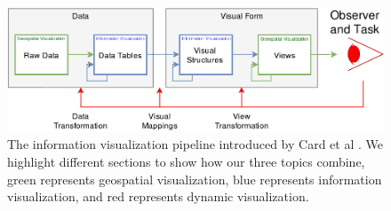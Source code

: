\begin{figure}[hb]
\centering
\includegraphics[width=1\textwidth]{images/ch1/TopicBreakdown2}
\caption{The information visualization pipeline introduced by Card et al \cite{card1999readings}. We highlight different sections to show how our three topics combine, green represents geospatial visualization, blue represents information visualization, and red represents dynamic visualization.                                                                                                                                                                                                                                                                                                                                                                                                                                                                                                                                                                                                                                                                                                                                                                                                                                                                                                                                                                                                                                                                                                                                                                                                                                                                                                                                                                                                                                                                                                               } \label{fig:topicbreakdown} 
\end{figure}

\newpage

